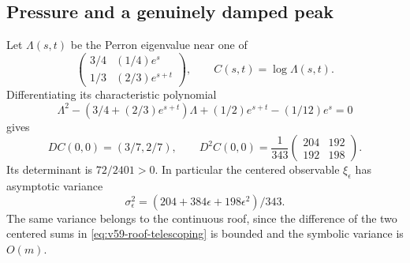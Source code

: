 \subsection{Pressure and a genuinely damped peak}
Let $\Lambda(s,t)$ be the Perron eigenvalue near one of
\[
 \begin{pmatrix}3/4&(1/4)e^s\\1/3&(2/3)e^{s+t}\end{pmatrix},
 \qquad C(s,t)=\log\Lambda(s,t).
\]
Differentiating its characteristic polynomial
\begin{equation}\label{eq:v59-characteristic-polynomial}
 \Lambda^2-(3/4+(2/3)e^{s+t})\Lambda
                     +(1/2)e^{s+t}-(1/12)e^s=0
\end{equation}
gives
\begin{equation}\label{eq:v59-joint-covariance}
 DC(0,0)=(3/7,2/7),\qquad
 D^2C(0,0)=\frac1{343}
       \begin{pmatrix}204&192\\192&198\end{pmatrix}.
\end{equation}
Its determinant is $72/2401>0$. In particular the centered observable
$\xi_\epsilon$ has asymptotic variance
\[
 \sigma_\epsilon^2=(204+384\epsilon+198\epsilon^2)/343.
\]
The same variance belongs to the continuous roof, since the difference
of the two centered sums in \eqref{eq:v59-roof-telescoping} is bounded
and the symbolic variance is $O(m)$.

